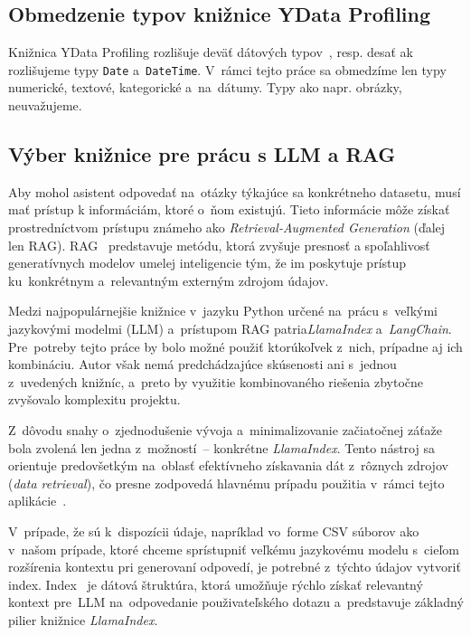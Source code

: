 \subsection{Obmedzenie typov knižnice YData Profiling}

Knižnica YData Profiling rozlišuje deväť dátových typov~\cite{ydata-profiling-datatypes}, resp. desať ak rozlišujeme typy \texttt{Date} a~\texttt{DateTime}. V~rámci tejto práce sa obmedzíme len typy numerické, textové, kategorické a~na~dátumy. Typy ako napr. obrázky, neuvažujeme.

\subsection{Výber knižnice pre prácu s LLM a RAG}

Aby mohol asistent odpovedať na~otázky týkajúce sa konkrétneho datasetu, musí mať prístup k informáciám, ktoré o~ňom existujú. Tieto informácie môže získať prostredníctvom prístupu známeho ako \textit{Retrieval-Augmented Generation} (ďalej len RAG). RAG~\cite{rag} predstavuje metódu, ktorá zvyšuje presnosť a spoľahlivosť generatívnych modelov umelej inteligencie tým, že im poskytuje prístup ku~konkrétnym a~relevantným externým zdrojom údajov.

Medzi najpopulárnejšie knižnice v~jazyku Python určené na~prácu s~veľkými jazykovými modelmi (LLM) a~prístupom RAG patria\textit{LlamaIndex} a~\textit{LangChain}. Pre~potreby tejto práce by bolo možné použiť ktorúkoľvek z~nich, prípadne aj ich kombináciu. Autor však nemá predchádzajúce skúsenosti ani s~jednou z~uvedených knižníc, a~preto by využitie kombinovaného riešenia zbytočne zvyšovalo komplexitu projektu.

Z~dôvodu snahy o~zjednodušenie vývoja a~minimalizovanie začiatočnej záťaže bola zvolená len jedna z~možností~-- konkrétne \textit{LlamaIndex}. Tento nástroj sa orientuje predovšetkým na~oblasť efektívneho získavania dát z~rôznych zdrojov (\textit{data retrieval}), čo presne zodpovedá hlavnému prípadu použitia v~rámci tejto aplikácie~\cite{langchain-vs-llamaindex}.

V~prípade, že sú k~dispozícii údaje, napríklad vo~forme CSV súborov ako v~našom prípade, ktoré chceme sprístupniť veľkému jazykovému modelu s~cieľom rozšírenia kontextu pri generovaní odpovedí, je potrebné z~týchto údajov vytvoriť index. Index~\cite{index} je dátová štruktúra, ktorá umožňuje rýchlo získať relevantný kontext pre~LLM na~odpovedanie použivateľského dotazu a~predstavuje základný pilier knižnice \textit{LlamaIndex}.

